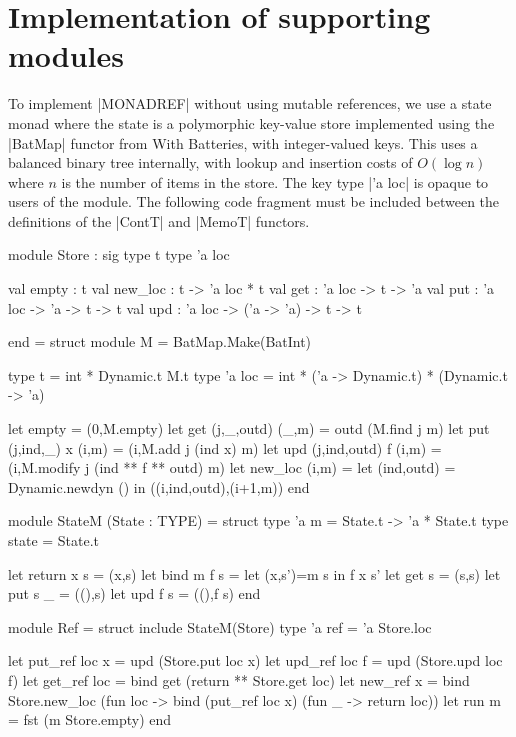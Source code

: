 \section{Implementation of supporting modules}
To implement |MONADREF| without using \OCaml mutable references,
we use a state monad where the state is a polymorphic key-value store implemented
using the |BatMap| functor from \OCaml With Batteries, with integer-valued keys.
This uses a balanced binary tree internally, with
lookup and insertion costs of $O(\log n)$ where $n$ is the number of items
in the store. The key type |'a loc| is opaque to users of the module.
The following code fragment must be included between the definitions of the
|ContT| and |MemoT| functors.
\begin{ocaml}
	module Store : sig
		type t
		type 'a loc

		val empty : t
		val new_loc : t -> 'a loc * t
		val get : 'a loc -> t -> 'a 
		val put : 'a loc -> 'a -> t -> t
		val upd : 'a loc -> ('a -> 'a) -> t -> t

	end = struct
		module M = BatMap.Make(BatInt)

		type t =  int * Dynamic.t M.t
		type 'a loc = int * ('a -> Dynamic.t) * (Dynamic.t -> 'a)

		let empty = (0,M.empty)
		let get (j,_,outd) (_,m)     = outd (M.find j m) 
		let put (j,ind,_) x (i,m)    = (i,M.add j (ind x) m)
		let upd (j,ind,outd) f (i,m) = (i,M.modify j (ind ** f ** outd) m)
		let new_loc (i,m) = let (ind,outd) = Dynamic.newdyn () in 
                        ((i,ind,outd),(i+1,m))
	end

	module StateM (State : TYPE) = struct
		type 'a m = State.t -> 'a * State.t 
		type state = State.t

		let return x s = (x,s)
		let bind m f s = let (x,s')=m s in f x s'
		let get s   = (s,s)
		let put s _ = ((),s)
		let upd f s = ((),f s)
	end

	module Ref = struct
		include StateM(Store)
		type 'a ref = 'a Store.loc

		let put_ref loc x  = upd (Store.put loc x)
		let upd_ref loc f  = upd (Store.upd loc f)
		let get_ref loc    = bind get (return ** Store.get loc)
		let new_ref x = bind Store.new_loc (fun loc ->
										bind (put_ref loc x) (fun _ -> return loc))
		let run m = fst (m Store.empty)
	end
\end{ocaml}
